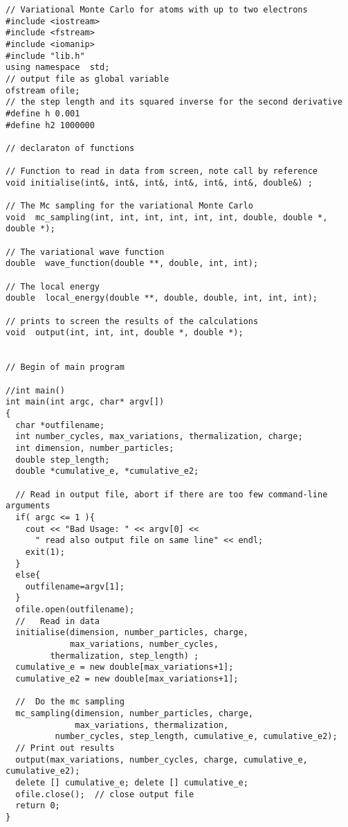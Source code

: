 \begin{lstlisting}[title={\url{http://folk.uio.no/compphys/programs/chapter14/cpp/program1.cpp}}]
// Variational Monte Carlo for atoms with up to two electrons 
#include <iostream>
#include <fstream>
#include <iomanip>
#include "lib.h"
using namespace  std;
// output file as global variable
ofstream ofile;  
// the step length and its squared inverse for the second derivative 
#define h 0.001
#define h2 1000000

// declaraton of functions 

// Function to read in data from screen, note call by reference  
void initialise(int&, int&, int&, int&, int&, int&, double&) ;

// The Mc sampling for the variational Monte Carlo 
void  mc_sampling(int, int, int, int, int, int, double, double *, double *);

// The variational wave function 
double  wave_function(double **, double, int, int);

// The local energy 
double  local_energy(double **, double, double, int, int, int);

// prints to screen the results of the calculations  
void  output(int, int, int, double *, double *);


// Begin of main program   

//int main()
int main(int argc, char* argv[])
{
  char *outfilename;
  int number_cycles, max_variations, thermalization, charge;
  int dimension, number_particles; 
  double step_length;
  double *cumulative_e, *cumulative_e2;

  // Read in output file, abort if there are too few command-line arguments
  if( argc <= 1 ){
    cout << "Bad Usage: " << argv[0] << 
      " read also output file on same line" << endl;
    exit(1);
  }
  else{
    outfilename=argv[1];
  }
  ofile.open(outfilename); 
  //   Read in data 
  initialise(dimension, number_particles, charge, 
             max_variations, number_cycles, 
	     thermalization, step_length) ;
  cumulative_e = new double[max_variations+1];
  cumulative_e2 = new double[max_variations+1];
  
  //  Do the mc sampling  
  mc_sampling(dimension, number_particles, charge, 
              max_variations, thermalization, 
	      number_cycles, step_length, cumulative_e, cumulative_e2);
  // Print out results  
  output(max_variations, number_cycles, charge, cumulative_e, cumulative_e2);
  delete [] cumulative_e; delete [] cumulative_e; 
  ofile.close();  // close output file
  return 0;
}
\end{lstlisting}

